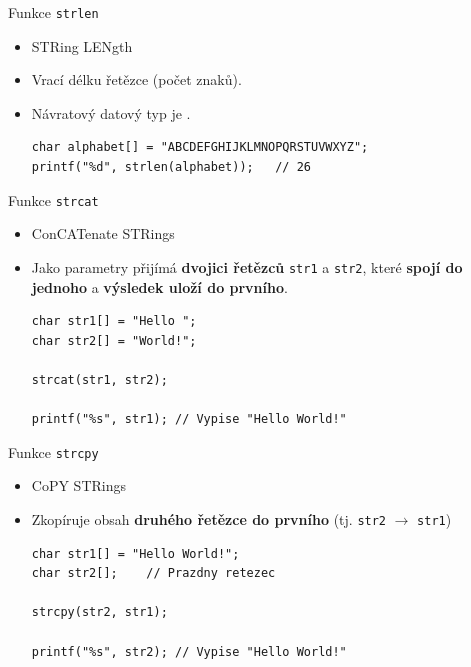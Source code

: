 \documentclass[14pt,aspectratio=169]{beamer}
\begin{document}
    \begin{frame}[t,fragile]{Funkce \texttt{strlen}}
        \begin{itemize}
            \item STRing LENgth
            \item Vrací délku řetězce (počet znaků).
            \item Návratový datový typ je .
            \begin{lstlisting}
char alphabet[] = "ABCDEFGHIJKLMNOPQRSTUVWXYZ";
printf("%d", strlen(alphabet));   // 26
            \end{lstlisting}
        \end{itemize}
    \end{frame}

    \begin{frame}[t,fragile]{Funkce \texttt{strcat}}
        \begin{itemize}
            \item ConCATenate STRings
            \item Jako parametry přijímá \textbf{dvojici řetězců} \texttt{str1} a \texttt{str2}, které \textbf{spojí do jednoho} a \textbf{výsledek uloží do prvního}.
            \begin{lstlisting}
char str1[] = "Hello ";
char str2[] = "World!";

strcat(str1, str2);

printf("%s", str1); // Vypise "Hello World!"
            \end{lstlisting}
        \end{itemize}
    \end{frame}

    \begin{frame}[t,fragile]{Funkce \texttt{strcpy}}
        \begin{itemize}
            \item CoPY STRings
            \item Zkopíruje obsah \textbf{druhého řetězce do prvního} (tj. \texttt{str2} $\rightarrow$ \texttt{str1})
            \begin{lstlisting}
char str1[] = "Hello World!";
char str2[];    // Prazdny retezec

strcpy(str2, str1);

printf("%s", str2); // Vypise "Hello World!"
            \end{lstlisting}
        \end{itemize}
    \end{frame}
\end{document}
